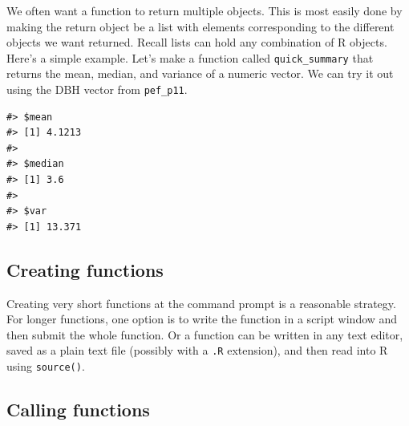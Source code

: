 \documentclass[
  11pt,
]{krantz}
\newenvironment{Shaded}{\begin{snugshade}}{\end{snugshade}}
\newcommand{\ControlFlowTok}[1]{\textcolor[rgb]{0.13,0.29,0.53}{\textbf{#1}}}
\newcommand{\KeywordTok}[1]{\textcolor[rgb]{0.13,0.29,0.53}{\textbf{#1}}}
\newcommand{\NormalTok}[1]{#1}
\newcommand{\OperatorTok}[1]{\textcolor[rgb]{0.81,0.36,0.00}{\textbf{#1}}}
\newcommand{\StringTok}[1]{\textcolor[rgb]{0.31,0.60,0.02}{#1}}
\theoremstyle{definition}
\theoremstyle{definition}
\theoremstyle{definition}
\theoremstyle{definition}
\theoremstyle{remark}
\begin{document}
We often want a function to return multiple objects. This is most easily done by making the return object be a list with elements corresponding to the different objects we want returned. Recall lists can hold any combination of R objects. Here's a simple example. Let's make a function called \texttt{quick\_summary} that returns the mean, median, and variance of a numeric vector. We can try it out using the DBH vector from \texttt{pef\_p11}.

\begin{Shaded}
\end{Shaded}

\begin{verbatim}
#> $mean
#> [1] 4.1213
#> 
#> $median
#> [1] 3.6
#> 
#> $var
#> [1] 13.371
\end{verbatim}

\hypertarget{creating-functions}{%
\subsection{Creating functions}\label{creating-functions}}

Creating very short functions at the command prompt is a reasonable strategy. For longer functions, one option is to write the function in a script window and then submit the whole function. Or a function can be written in any text editor, saved as a plain text file (possibly with a \texttt{.R} extension), and then read into R using \texttt{source()}.

\hypertarget{callingFunctions}{%
\subsection{Calling functions}\label{callingFunctions}}
\end{document}
